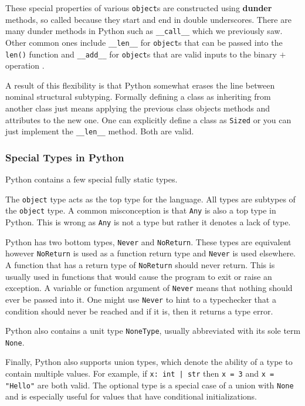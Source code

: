\documentclass[10pt,twocolumn]{article}
\begin{document}
These special properties of various \verb|object|s are constructed using \textbf{dunder} methods, so called because they start and end in double underscores. There are many dunder methods in Python such as \verb|__call__| which we previously saw. Other common ones include \verb|__len__| for \verb|object|s that can be passed into the \verb|len()| function and \verb|__add__| for \verb|object|s that are valid inputs to the binary $+$ operation \cite{pythondatamodel}.

A result of this flexibility is that Python somewhat erases the line between nominal structural subtyping. Formally defining a class as inheriting from another class just means applying the previous class objects methods and attributes to the new one. One can explicitly define a class as \verb|Sized| or you can just implement the \verb|__len__| method. Both are valid.

\subsubsection{Special Types in Python}
Python contains a few special fully static types. 

The \verb|object| type acts as the top type for the language. All types are subtypes of the \verb|object| type. A common misconception is that \verb|Any| is also a top type in Python. This is wrong as \verb|Any| is not a type but rather it denotes a lack of type. 

Python has two bottom types, \verb|Never| and \verb|NoReturn|. These types are equivalent however \verb|NoReturn| is used as a function return type and \verb|Never| is used elsewhere. A function that has a return type of \verb|NoReturn| should never return. This is usually used in functions that would cause the program to exit or raise an exception. A variable or function argument of \verb|Never| means that nothing should ever be passed into it. One might use \verb|Never| to hint to a typechecker that a condition should never be reached and if it is, then it returns a type error. 

Python also contains a unit type \verb|NoneType|, usually abbreviated with its sole term \verb|None|. 

Finally, Python also supports union types, which denote the ability of a type to contain multiple values. For example, if \verb+x: int | str+ then \verb|x = 3| and \verb|x = "Hello"| are both valid. The optional type is a special case of a union with \verb|None| and is especially useful for values that have conditional initializations.
\end{document}
